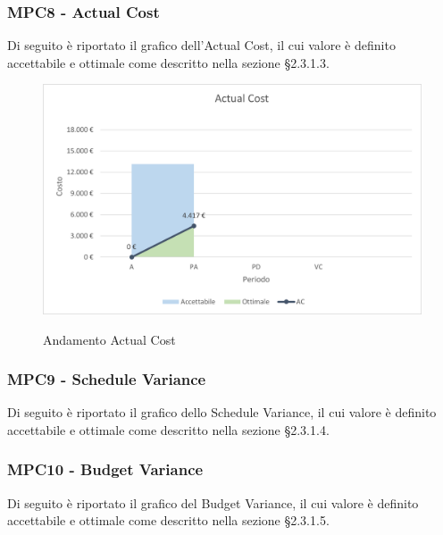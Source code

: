 \subsubsection{MPC8 - Actual Cost}
Di seguito è riportato il grafico dell'Actual Cost, il cui valore è definito accettabile e ottimale come descritto nella sezione §2.3.1.3.\\

\begin{figure}[H]
\centering
\includegraphics[scale=0.78]{res/ResocontoAttivitaDiVerifica/res/metriche/grafici/img/actualCost.png}\\
\caption{Andamento Actual Cost}
\end{figure}

\subsubsection{MPC9 - Schedule Variance}
Di seguito è riportato il grafico dello Schedule Variance, il cui valore è definito accettabile e ottimale come descritto nella sezione §2.3.1.4.\\

\subsubsection{MPC10 - Budget Variance}
Di seguito è riportato il grafico del Budget Variance, il cui valore è definito accettabile e ottimale come descritto nella sezione §2.3.1.5.\\


